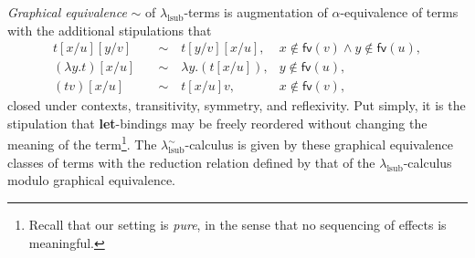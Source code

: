 \emph{Graphical equivalence} $\sim$ of $\lambda_{\text{lsub}}$-terms is augmentation of $\alpha$-equi\-va\-lence of terms with the additional stipulations that
\begin{align}
	t [x/u] [y/v] \quad        & \sim \quad t [y/v] [x/u],        & x \notin \textsf{fv} (v) \land y \notin \textsf{fv} (u), \nonumber \\
	\label{eq:subst-lambda}
	(\lambda y. t) [x/u] \quad & \sim \quad \lambda y. (t [x/u]), & y \notin \textsf{fv} (u), \tag{$\ast$}                             \\
	(t v) [x/u] \quad          & \sim \quad t [x/u] v,            & x \notin \textsf{fv} (v), \nonumber
\end{align}
closed under contexts, transitivity, symmetry, and reflexivity.
Put simply, it is the stipulation that \textbf{let}-bindings may be freely reordered without changing the meaning of the term\footnote{Recall that our setting is \emph{pure}, in the sense that no sequencing of effects is meaningful.}.
The $\lambda^\sim_{\text{lsub}}$-calculus is given by these graphical equivalence classes of terms with the reduction relation defined by that of the $\lambda_{\text{lsub}}$-calculus modulo graphical equivalence.

